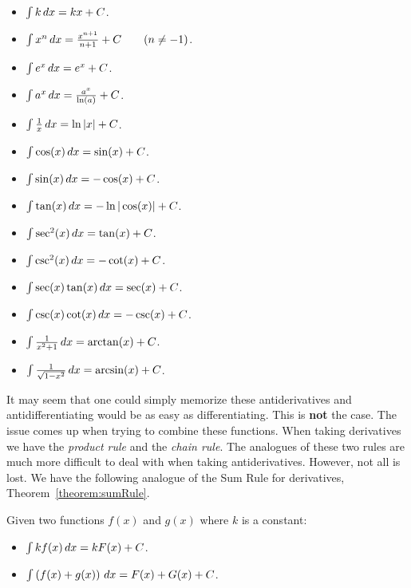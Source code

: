 \begin{fullwidth}
\begin{mainTheorem}\label{theorem:basicAnti} \hfil
\begin{multicols}{3}
\begin{itemize}
\item $\int k \, d x= kx+C$.
\item $\int x^n \, d x= \frac{x^{n+1}}{n+1}+C\qquad(n\ne-1)$.
\item $\int e^x \, d x= e^x + C$.
\item $\int a^x \, d x= \frac{a^x}{\ln(a)}+C$.
\item $\int \frac{1}{x} \, d x= \ln|x|+C$.
\item $\int \cos(x) \, d x = \sin(x) + C$.
\item $\int \sin(x) \, d x = -\cos(x) + C$.  
\item $\int \tan(x) \, d x = -\ln|\cos(x)| + C$.  
\item $\int \sec^2(x) \, d x = \tan(x) + C$. 
\item $\int \csc^2(x) \, d x = -\cot(x) + C$.
\item $\int \sec(x)\tan(x) \, d x = \sec(x) + C$.
\item $\int \csc(x)\cot(x) \, d x = -\csc(x) + C$.
\item $\int \frac{1}{x^2+1}\, d x = \arctan(x) + C$.
\item $\int \frac{1}{\sqrt{1-x^2}}\, d x= \arcsin(x)+C$.
\end{itemize}
\end{multicols}
\end{mainTheorem}
\end{fullwidth}
It may seem that one could simply memorize these antiderivatives and
antidifferentiating would be as easy as differentiating. This is
\textbf{not} the case. The issue comes up when trying to combine these
functions.  When taking derivatives we have the \textit{product rule}
and the \textit{chain rule}. The analogues of these two rules are much
more difficult to deal with when taking antiderivatives. However, not
all is lost. We have the following analogue of the Sum Rule for
derivatives, Theorem~\ref{theorem:sumRule}.

\begin{mainTheorem}\label{theorem:SRA}
Given two functions $f(x)$ and $g(x)$ where $k$ is a constant:
\begin{itemize}
\item $\int k f(x) \, d x= kF(x) + C$.
\item $\int \left(f(x) + g(x)\right) \, d x = F(x) + G(x) + C$.
\end{itemize}
\end{mainTheorem}

